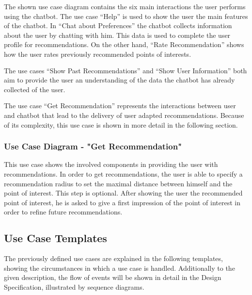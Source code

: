 	The shown use case diagram contains the six main interactions the user performs using the chatbot. The use case “Help” is used to show the user the main features of the chatbot. In “Chat about Preferences” the chatbot collects information about the user by chatting with him. This data is used to complete the user profile for recommendations. On the other hand, “Rate Recommendation” shows how the user rates previously recommended points of interests.
	
	The use cases “Show Past Recommendations” and “Show User Information” both aim to provide the user an understanding of the data the chatbot has already collected of the user.
	
The use case “Get Recommendation” represents the interactions between user and chatbot that lead to the delivery of user adapted recommendations. Because of its complexity, this use case is shown in more detail in the following section.

\subsubsection{Use Case Diagram - "Get Recommendation"}

This use case shows the involved components in providing the user with recommendations. In order to get recommendations, the user is able to specify a recommendation radius to set the maximal distance between himself and the point of interest. This step is optional. After showing the user the recommended point of interest, he is asked to give a first impression of the point of interest in order to refine future recommendations.

\subsection{Use Case Templates}
The previously defined use cases are explained in the following templates, showing the circumstances in which a use case is handled. Additionally to the given description, the flow of events will be shown in detail in the Design Specification, illustrated by sequence diagrams.

